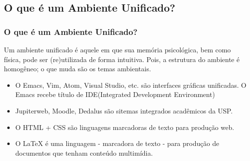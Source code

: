 \documentclass{beamer}
\begin{document}
\begin{frame}

  \section{O que é um Ambiente Unificado?}
  \frametitle{O que é um Ambiente Unificado?}
  \pause
  \begin{Definition}[Definiçãos]
    Um \alert{ambiente unificado} é aquele em que sua memória psicológica, bem como
    física, pode ser (re)utilizada de forma intuitiva. Pois, a estrutura do ambiente é
    homogêneo; o que muda são os temas ambientais.
    \end{Definition}
    \pause

    \begin{example}[Exemplos]
      \begin{itemize}

      \item O Emacs, Vim, Atom, Visual Studio, etc. são interfaces gráficas unificadas. O
        Emacs recebe título de IDE(Integrated Development Environment)

        \pause

      \item Jupiterweb, Moodle, Dedalus são sitemas integrados acadêmicos da
        USP.
        \pause
      \item O HTML + CSS são linguagens marcadoras de texto para produção web.
        \pause
      \item O \alert{\LaTeX} é uma linguagem - marcadora de texto - para produção de documentos
        que tenham conteúdo multimídia.
      \end{itemize}
    \end{example}
\end{frame}
\end{document}
